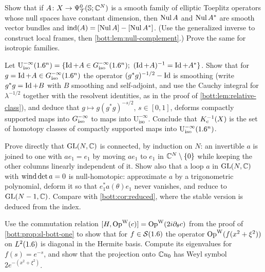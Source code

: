 \begin{exercise}\label{bott:ex:constant-null}
  Show that if $A\colon X\to\Psi^{0}_{\mathcal{T}}(\mathbb{S};\mathbb{C}^N)$ is a smooth family of elliptic Toeplitz
  operators whose null spaces have constant dimension, then $\operatorname{Nul} A$ and $\operatorname{Nul} A^*$ are smooth
  vector bundles and $\operatorname{ind}(A)=[\operatorname{Nul} A]-[\operatorname{Nul} A^*]$. (Use the generalized inverse to construct
  local frames, then \cref{bott:lem:null-complement}.) Prove the same for isotropic families.
\end{exercise}

\begin{exercise}\label{bott:ex:unitary}
  Let $\mathrm U^{-\infty}_{\mathrm{iso}}(\R^n)=\{\Id+A\in\Gres(\R^n);\ (\Id+A)^{-1}=\Id+A^*\}$.
  Show that for $g=\operatorname{Id}+A\in G^{-\infty}_{\mathrm{iso}}(1.6^n)$ the operator $(g^*g)^{-1/2}-\operatorname{Id}$ is smoothing
  (write $g^*g=\operatorname{Id}+B$ with $B$ smoothing and self-adjoint, and use the Cauchy integral for
  $\lambda^{-1/2}$ together with the resolvent identities, as in the proof of
  \cref{bott:lem:relative-class}), and deduce that $g\mapsto g(g^*g)^{-s/2}$, $s\in[0,1]$, deforms
  compactly supported maps into $G^{-\infty}_{\mathrm{iso}}$ to maps into $\mathrm U^{-\infty}_{\mathrm{iso}}$. Conclude
  that $K_{\mathrm{c}}^{-1}(X)$ is the set of homotopy classes of compactly supported maps into
  $\mathrm U^{-\infty}_{\mathrm{iso}}(1.6^n)$.
\end{exercise}

\begin{exercise}\label{bott:ex:GL-connected}
  Prove directly that $\operatorname{GL}(N,\mathbb{C})$ is connected, by induction on $N$: an invertible $a$ is joined
  to one with $ae_1=e_1$ by moving $ae_1$ to $e_1$ in $\mathbb{C}^N\setminus\{0\}$ while keeping the other
  columns linearly independent of it. Show also that a loop $a$ in $\operatorname{GL}(N,\mathbb{C})$ with
  $\operatorname{wind}\det a=0$ is null-homotopic: approximate $a$ by a trigonometric polynomial, deform
  it so that $e_1^*a(\theta)e_1$ never vanishes, and reduce to $\operatorname{GL}(N-1,\mathbb{C})$. Compare with
  \cref{bott:cor:reduced}, where the stable version is deduced from the index.
\end{exercise}

\begin{exercise}\label{bott:ex:radial-weyl}
  Use the commutation relation $[H,\operatorname{Op}^{\mathrm{W}}(c)]=\operatorname{Op}^{\mathrm{W}}(2i\partial_\theta c)$ from the proof of
  \cref{bott:prop:sl-bott-one} to show that for $f\in\mathcal{S}(1.6)$ the operator $\operatorname{Op}^{\mathrm{W}}(f(x^2+\xi^2))$
  on $L^2(1.6)$ is diagonal in the Hermite basis. Compute its eigenvalues for
  $f(s)=e^{-s}$, and show that the projection onto $\mathbb{C} u_0$ has Weyl symbol
  $2e^{-(x^2+\xi^2)}$.
\end{exercise}

